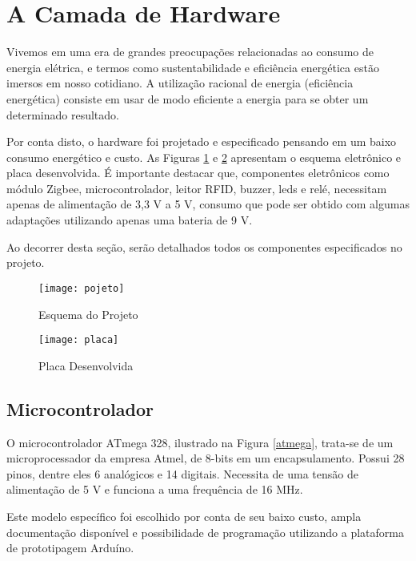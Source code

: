 \documentclass[tcc,capa]{texufpel}
\begin{document}
    
    
    \section{A Camada de Hardware}
    
        Vivemos em uma era de grandes preocupações relacionadas ao consumo de energia elétrica, e termos como sustentabilidade e eficiência energética estão imersos em nosso cotidiano.
        A utilização racional de energia (eficiência energética) consiste em usar de modo eficiente a energia para se obter um determinado resultado.
        
        Por conta disto, o hardware foi projetado e especificado pensando em um baixo consumo energético e custo. As Figuras \ref{projeto} e \ref{placa}  apresentam o esquema eletrônico e placa desenvolvida. É importante destacar que, componentes eletrônicos como módulo Zigbee, microcontrolador, leitor RFID, buzzer, leds e relé, necessitam apenas de alimentação de 3,3 V a 5 V, consumo que pode ser obtido com algumas adaptações utilizando apenas uma bateria de 9 V. 
        
        Ao decorrer desta seção, serão detalhados todos os componentes especificados no projeto.
        
        \begin{figure}[H]
            \centering 
            \texttt{[image: pojeto]}
            \caption{Esquema do Projeto} 
            \label{projeto}
        \end{figure}
        \begin{figure}[H]
            \centering 
            \texttt{[image: placa]}
            \caption{Placa Desenvolvida} 
            \label{placa}
        \end{figure}
    
        \subsection{Microcontrolador}
        
            O microcontrolador ATmega 328, ilustrado na Figura \ref{atmega}, trata-se de um microprocessador da empresa Atmel, de 8-bits em um encapsulamento. Possui 28 pinos, dentre eles 6 analógicos e 14 digitais. Necessita de uma tensão de alimentação de 5 V e funciona a uma frequência de 16 MHz.
            
            Este modelo específico foi escolhido por conta de seu baixo custo, ampla documentação disponível e possibilidade de programação utilizando a plataforma de prototipagem Arduíno.
            
\end{document}
